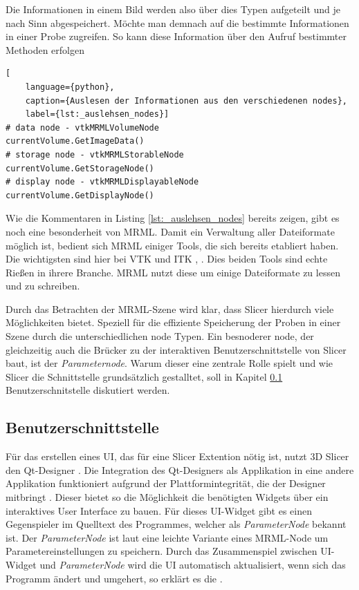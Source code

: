 Die Informationen in einem Bild werden also über dies Typen aufgeteilt und je nach
Sinn abgespeichert. Möchte man demnach auf die bestimmte Informationen in einer
Probe zugreifen. So kann diese Information über den Aufruf bestimmter Methoden erfolgen

\begin{lstlisting}[
	language={python},
	caption={Auslesen der Informationen aus den verschiedenen nodes},
	label={lst:_auslehsen_nodes}]
# data node - vtkMRMLVolumeNode
currentVolume.GetImageData()
# storage node - vtkMRMLStorableNode
currentVolume.GetStorageNode()
# display node - vtkMRMLDisplayableNode
currentVolume.GetDisplayNode()
\end{lstlisting}

Wie die Kommentaren in Listing \ref{lst:_auslehsen_nodes} bereits zeigen, gibt
es noch eine besonderheit von MRML. Damit ein Verwaltung aller Dateiformate möglich
ist, bedient sich MRML einiger Tools, die sich bereits etabliert haben. Die
wichtigsten sind hier bei \ac{VTK} und \ac{ITK} \citep[vgl.][]{vtk2024}, \citep[vgl.][]{itk2024}.
Dies beiden Tools sind echte Rießen in ihrere Branche. \ac{MRML} nutzt diese um
einige Dateiformate zu lessen und zu schreiben.

Durch das Betrachten der MRML-Szene wird klar, dass Slicer hierdurch viele Möglichkeiten
bietet. Speziell für die effiziente Speicherung der Proben in einer Szene durch
die unterschiedlichen node Typen. Ein besnoderer node, der gleichzeitig auch die
Brücker zu der interaktiven Benutzerschnittstelle von Slicer baut, ist der \textit{Parameternode}.
Warum dieser eine zentrale Rolle spielt und wie Slicer die Schnittstelle grundsätzlich
gestalltet, soll in Kapitel \ref{subsec:benutzerschnitstelle}
Benutzerschnitstelle diskutiert werden.

\subsection{Benutzerschnittstelle}
\label{subsec:benutzerschnitstelle} Für das erstellen eines \ac{UI}, das für
eine Slicer Extention nötig ist, nutzt 3D Slicer den Qt-Designer \citep[vgl.][]{qt2024}.
Die Integration des Qt-Designers als Applikation in eine andere Applikation funktioniert
aufgrund der Plattformintegrität, die der Designer mitbringt \citep[vgl.][]{qt2024}.
Dieser bietet so die Möglichkeit die benötigten Widgets über ein interaktives
User Interface zu bauen. Für dieses UI-Widget gibt es einen Gegenspieler im Quelltext
des Programmes, welcher als \textit{ParameterNode} bekannt ist. Der \textit{ParameterNode}
ist laut \citet{slicer2024} eine leichte Variante eines MRML-Node um
Parametereinstellungen zu speichern. Durch das Zusammenspiel zwischen UI-Widget und
\textit{ParameterNode} wird die UI automatisch aktualisiert, wenn sich das Programm
ändert und umgehert, so erklärt es die \citet{slicer2024}.

